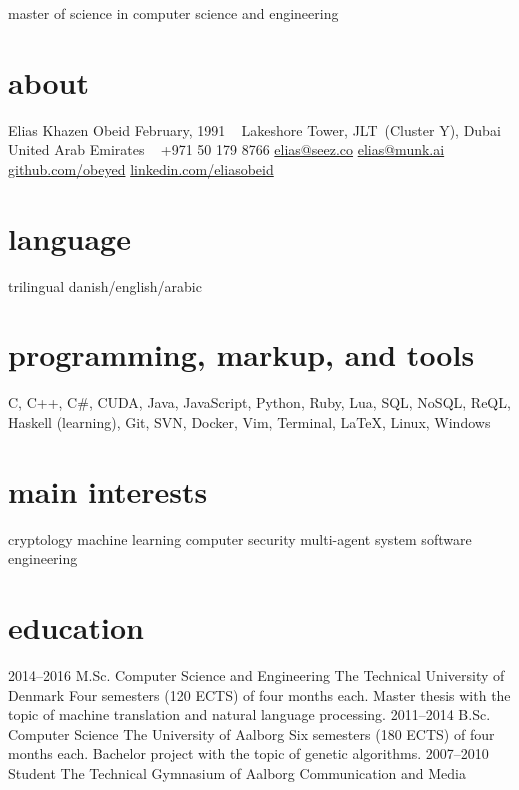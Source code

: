 \documentclass[]{friggeri-cv}
\begin{document}
    {master of science in computer science and engineering}

\begin{aside}
  \section{about}
    Elias Khazen Obeid
    February, 1991
    ~
    Lakeshore Tower, JLT~(Cluster Y), Dubai
    United Arab Emirates
    ~
    +971 50 179 8766
    \href{mailto:elias@seez.co}{elias@seez.co}
    \href{mailto:elias@munk.ai}{elias@munk.ai}
    \href{https://github.com/obeyed}{github.com/obeyed}
    \href{https://www.linkedin.com/in/eliasobeid}{linkedin.com/eliasobeid}
  \section{language}
    trilingual danish/english/arabic
  \section{programming, markup, and tools}
    C, C++, C\#, CUDA, Java, JavaScript, Python, Ruby, Lua, 
    SQL, NoSQL, ReQL, 
    Haskell (learning),
    Git, SVN, Docker, Vim, Terminal, \LaTeX{}, Linux, Windows
  \section{main interests}
    cryptology
    machine learning
    computer security
    multi-agent system
    software engineering
\end{aside}

\section{education}

\begin{entrylist}
  \entry
    {2014--2016}
    {M.Sc. {\normalfont Computer Science and Engineering}}
    {The Technical University of Denmark}
    {Four semesters (120 ECTS) of four months each.
	Master thesis with the topic of machine translation and natural language processing.}
  \entry
    {2011--2014}
    {B.Sc. {\normalfont Computer Science}}
    {The University of Aalborg}
    {Six semesters (180 ECTS) of four months each.
	Bachelor project with the topic of genetic algorithms.}
  \entry
    {2007--2010}
    {Student}
    {The Technical Gymnasium of Aalborg}
    {Communication and Media}
\end{entrylist}
\end{document}
